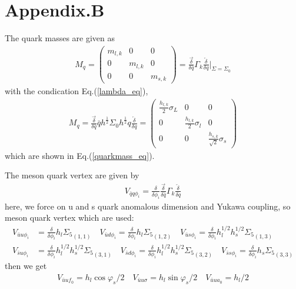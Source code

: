 \documentclass[12pt]{article}
\begin{document}
\section{Appendix.B}\label{appx_B}

The quark masses are given as
\begin{align}
M_q
=\begin{pmatrix} 
m_{l,k}&0&0\\
0&m_{l,k}&0\\
0&0&m_{s,k}
\end{pmatrix} 
=\frac{\overrightarrow{\delta}}{\delta \bar q}\Gamma_k\frac{\overleftarrow{\delta}}{\delta q}\Bigg|_{\Sigma=\Sigma_0}
\end{align}
with the condication Eq.(\ref{lambda_eq}),
\begin{align}
M_q
=\frac{\overrightarrow{\delta}}{\delta \bar q}\bar q h^{\frac{1}{2}} \Sigma_0 h^{\frac{1}{2}} q \frac{\overleftarrow{\delta}}{\delta q}
=\begin{pmatrix} 
\frac{h_{l,k}}{2}\sigma_L&0&0\\
0&\frac{h_{l,k}}{2}\sigma_l&0\\
0&0&\frac{h_{s,k}}{\sqrt{2}}\sigma_s
\end{pmatrix} 
\end{align}
which are shown in Eq.(\ref{quarkmass_eq}).

The meson quark vertex are given by
\begin{align}
V_{\bar q q \phi_i}=\frac{\delta}{\delta \phi_i}\frac{\overrightarrow{\delta}}{\delta \bar q}\Gamma_k \frac{\overleftarrow{\delta}}{\delta q}
\end{align}
here, we force on u and s quark anomalous dimension and Yukawa coupling, so meson quark vertex which are used:
\begin{align}
V_{\bar u u \phi_i}&=\frac{\delta}{\delta \phi_i}h_l {\Sigma_5}_{(1,1)}  \quad  V_{\bar u d \phi_i}=\frac{\delta}{\delta \phi_i}h_l {\Sigma_5}_{(1,2)} \quad V_{\bar u s \phi_i}=\frac{\delta}{\delta \phi_i}h_l^{1/2}h_s^{1/2}{\Sigma_5}_{(1,3)}\\
V_{\bar s u \phi_i}&=\frac{\delta}{\delta \phi_i}h_l^{1/2}h_s^{1/2} {\Sigma_5}_{(3,1)} \quad  V_{\bar s d \phi_i}=\frac{\delta}{\delta \phi_i}h_l^{1/2}h_s^{1/2} {\Sigma_5}_{(3,2)} \quad  V_{\bar s s \phi_i}=\frac{\delta}{\delta \phi_i}h_s {\Sigma_5}_{(3,3)}
\end{align}
then we get
\begin{align}
V_{\bar u u f_0}=h_l \cos\varphi_s /2 \quad V_{\bar u u \sigma}=h_l \sin\varphi_s /2 \quad V_{\bar u u a_0}=h_l /2%
\end{align}
\end{document}
